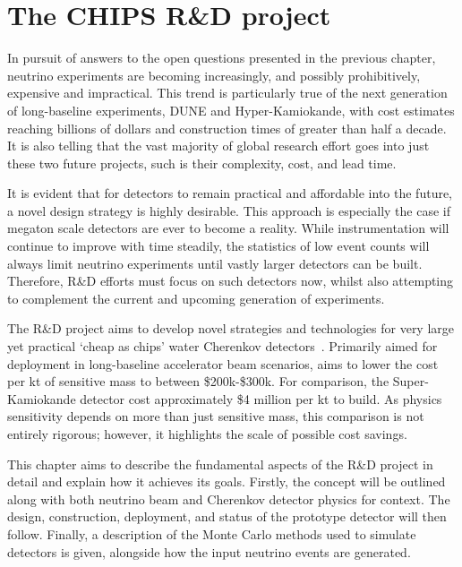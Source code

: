 \chapter{The CHIPS R\&D project} %
\label{chap:chips} %

In pursuit of answers to the open questions presented in the previous chapter, neutrino
experiments are becoming increasingly, and possibly prohibitively, expensive and impractical. This
trend is particularly true of the next generation of long-baseline experiments, DUNE and
Hyper-Kamiokande, with cost estimates reaching billions of dollars and construction times of
greater than half a decade. It is also telling that the vast majority of global research effort
goes into just these two future projects, such is their complexity, cost, and lead time.

It is evident that for detectors to remain practical and affordable into the future, a novel
design strategy is highly desirable. This approach is especially the case if megaton scale
detectors are ever to become a reality. While instrumentation will continue to improve with time
steadily, the statistics of low event counts will always limit neutrino experiments until vastly
larger detectors can be built. Therefore, R\&D efforts must focus on such detectors now, whilst
also attempting to complement the current and upcoming generation of experiments.

The \chips R\&D project aims to develop novel strategies and technologies for very large yet
practical `cheap as chips' water Cherenkov detectors~\cite{adamson2013}. Primarily aimed for
deployment in long-baseline accelerator beam scenarios, \chips aims to lower the cost per kt of
sensitive mass to between \$200k-\$300k. For comparison, the Super-Kamiokande detector cost
approximately \$4 million per kt to build. As physics sensitivity depends on more than just
sensitive mass, this comparison is not entirely rigorous; however, it highlights the scale of
possible cost savings.

This chapter aims to describe the fundamental aspects of the \chips R\&D project in detail and
explain how it achieves its goals. Firstly, the \chips concept will be outlined along with both
neutrino beam and Cherenkov detector physics for context. The design, construction, deployment,
and status of the \chipsfive prototype detector will then follow. Finally, a description of the
Monte Carlo methods used to simulate \chips detectors is given, alongside how the input neutrino
events are generated.

